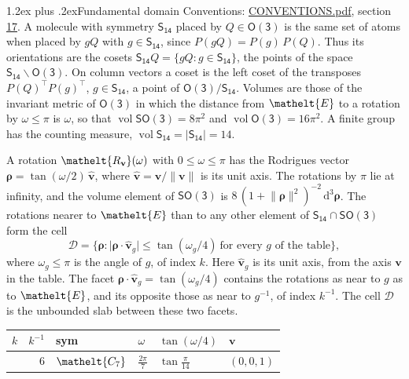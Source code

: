 \documentclass[10pt,a4paper]{article}
\makeatletter
\renewcommand\section{\@startsection{section}{1}{\z@}{-3ex plus -1ex minus -.2ex}%
  {1.2ex plus .2ex}{\normalfont\large\sffamily\bfseries\color{parttitle}}}
\numberwithin{equation}{section}
\newcommand{\eltfont}[1]{{\let\sigma\eltsigma\mathelt{#1}}}
\newcommand{\grp}[1]{\mathsf{#1}}
\newcommand{\cls}[1]{\eltfont{#1}}
\newcommand{\elt}[1]{\eltfont{#1}}
\newcommand{\dirvec}[3]{(#1, #2, #3)}
\newcommand{\unitaxis}{\hat{\mathbf{v}}}
\newcommand{\vv}{\mathbf{v}}
\newcommand{\diff}{\mathrm{d}}
\newcommand{\vol}{\operatorname{vol}}
\newcommand{\rodrigues}{\boldsymbol{\rho}}
\newcommand{\fcell}{\mathcal{D}}
\makeatother
\begin{document}
\section{Fundamental domain}\label{s:fundamental_domain}
Conventions: \href{../../CONVENTIONS.pdf}{CONVENTIONS.pdf}, section \href{../../CONVENTIONS.pdf\#conv.17}{17}.
\leavevmode\label{n:element.placement}A molecule with symmetry $\grp{S_{14}}$ placed by $Q \in \grp{O(3)}$ is the same set of atoms when placed by $gQ$ with $g \in \grp{S_{14}}$, since $P(gQ) = P(g)\,P(Q)$. \label{n:operator.cosets}Thus its orientations are the cosets $\grp{S_{14}}Q = \{gQ : g \in \grp{S_{14}}\}$, the points of the space $\grp{S_{14}}\backslash\grp{O(3)}$. On column vectors a coset is the left coset of the transposes $P(Q)^{\top}P(g)^{\top}$, $g \in \grp{S_{14}}$, a point of $\grp{O(3)}/\grp{S_{14}}$.
\leavevmode\label{n:operator.volume}Volumes are those of the invariant metric of \href{O3.pdf}{$\grp{O(3)}$} in which the distance from $\elt{E}$ to a rotation by $\omega \le \pi$ is $\omega$, so that $\vol\grp{SO(3)} = 8\pi^2$ and $\vol\grp{O(3)} = 16\pi^2$. A finite group has the counting measure, $\vol\grp{S_{14}} = |\grp{S_{14}}| = 14$.

\leavevmode\label{n:vector.rodrigues}\label{n:vector.unitaxis}A rotation $\elt{R_{\vv}}(\omega)$ with $0 \le \omega \le \pi$ has the Rodrigues vector $\rodrigues = \tan(\omega/2)\,\unitaxis$, where $\unitaxis = \vv/\lVert\vv\rVert$ is its unit axis. The rotations by $\pi$ lie at infinity, and the volume element of \href{SO3.pdf}{$\grp{SO(3)}$} is $8\,(1 + \lVert\rodrigues\rVert^2)^{-2}\,\diff^3\rodrigues$.
\leavevmode\label{n:set.cell}The rotations nearer to $\elt{E}$ than to any other element of $\grp{S_{14}} \cap \grp{SO(3)}$ form the cell
\begin{equation}\label{e:cell}\fcell = \bigl\{\rodrigues : \lvert\rodrigues\cdot\unitaxis_g\rvert \le \tan(\omega_g/4)\ \text{for every $g$ of the table}\bigr\},\end{equation}
where $\omega_g \le \pi$ is the angle of $g$, of index $k$. Here $\unitaxis_g$ is its unit axis, from the axis $\vv$ in the table. The facet $\rodrigues\cdot\unitaxis_g = \tan(\omega_g/4)$ contains the rotations as near to $g$ as to $\elt{E}$, and its opposite those as near to $g^{-1}$, of index $k^{-1}$. The cell $\fcell$ is the unbounded slab between these two facets.
{\small{\renewcommand{\arraystretch}{1.3}\begin{longtable}{@{}rrllll@{}}\toprule
$k$ & $k^{-1}$ & sym & $\omega$ & $\tan(\omega/4)$ & $\vv$\\\midrule\endhead
\bottomrule\endfoot\endlastfoot
1 & 6 & $\cls{C_{7}}$ & $\tfrac{2\pi}{7}$ & $\tan\tfrac{\pi}{14}$ & $\dirvec{0}{0}{1}$\\
\bottomrule\end{longtable}}}
\end{document}
